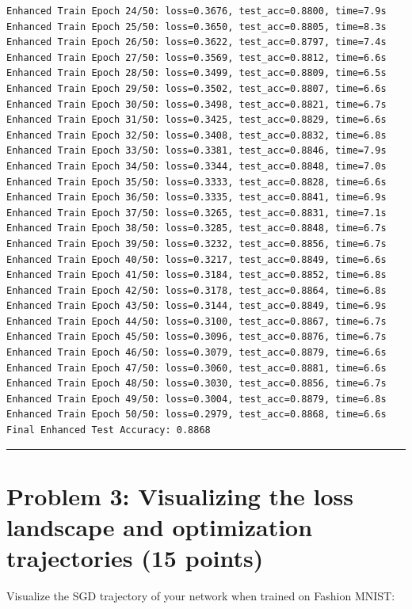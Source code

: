 \documentclass[
  letterpaper,
  DIV=11,
  numbers=noendperiod]{scrartcl}
\begin{document}
\begin{verbatim}
Enhanced Train Epoch 24/50: loss=0.3676, test_acc=0.8800, time=7.9s
Enhanced Train Epoch 25/50: loss=0.3650, test_acc=0.8805, time=8.3s
Enhanced Train Epoch 26/50: loss=0.3622, test_acc=0.8797, time=7.4s
Enhanced Train Epoch 27/50: loss=0.3569, test_acc=0.8812, time=6.6s
Enhanced Train Epoch 28/50: loss=0.3499, test_acc=0.8809, time=6.5s
Enhanced Train Epoch 29/50: loss=0.3502, test_acc=0.8807, time=6.6s
Enhanced Train Epoch 30/50: loss=0.3498, test_acc=0.8821, time=6.7s
Enhanced Train Epoch 31/50: loss=0.3425, test_acc=0.8829, time=6.6s
Enhanced Train Epoch 32/50: loss=0.3408, test_acc=0.8832, time=6.8s
Enhanced Train Epoch 33/50: loss=0.3381, test_acc=0.8846, time=7.9s
Enhanced Train Epoch 34/50: loss=0.3344, test_acc=0.8848, time=7.0s
Enhanced Train Epoch 35/50: loss=0.3333, test_acc=0.8828, time=6.6s
Enhanced Train Epoch 36/50: loss=0.3335, test_acc=0.8841, time=6.9s
Enhanced Train Epoch 37/50: loss=0.3265, test_acc=0.8831, time=7.1s
Enhanced Train Epoch 38/50: loss=0.3285, test_acc=0.8848, time=6.7s
Enhanced Train Epoch 39/50: loss=0.3232, test_acc=0.8856, time=6.7s
Enhanced Train Epoch 40/50: loss=0.3217, test_acc=0.8849, time=6.6s
Enhanced Train Epoch 41/50: loss=0.3184, test_acc=0.8852, time=6.8s
Enhanced Train Epoch 42/50: loss=0.3178, test_acc=0.8864, time=6.8s
Enhanced Train Epoch 43/50: loss=0.3144, test_acc=0.8849, time=6.9s
Enhanced Train Epoch 44/50: loss=0.3100, test_acc=0.8867, time=6.7s
Enhanced Train Epoch 45/50: loss=0.3096, test_acc=0.8876, time=6.7s
Enhanced Train Epoch 46/50: loss=0.3079, test_acc=0.8879, time=6.6s
Enhanced Train Epoch 47/50: loss=0.3060, test_acc=0.8881, time=6.6s
Enhanced Train Epoch 48/50: loss=0.3030, test_acc=0.8856, time=6.7s
Enhanced Train Epoch 49/50: loss=0.3004, test_acc=0.8879, time=6.8s
Enhanced Train Epoch 50/50: loss=0.2979, test_acc=0.8868, time=6.6s
Final Enhanced Test Accuracy: 0.8868
\end{verbatim}

\begin{center}\rule{0.5\linewidth}{0.5pt}\end{center}

\section{Problem 3: Visualizing the loss landscape and optimization
trajectories (15
points)}\label{problem-3-visualizing-the-loss-landscape-and-optimization-trajectories-15-points}

Visualize the SGD trajectory of your network when trained on Fashion
MNIST:
\end{document}
